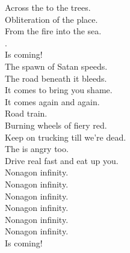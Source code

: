 Across the  to the trees. \\
Obliteration of the place. \\
From the fire into the sea. \\
. \\
Is coming! \\

The spawn of Satan speeds. \\
The road beneath it bleeds. \\
It comes to bring you shame. \\
It comes again and again. \\

Road train. \\

Burning wheels of fiery red. \\
Keep on trucking till we're dead. \\
The  is angry too. \\
Drive real fast and eat up you. \\

Nonagon infinity. \\
Nonagon infinity. \\
Nonagon infinity. \\
Nonagon infinity. \\
Nonagon infinity. \\
Nonagon infinity. \\
Is coming! \\
